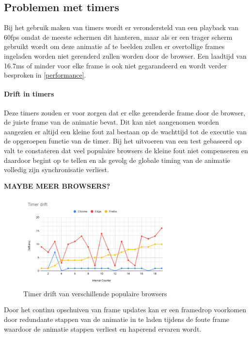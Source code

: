 \subsection{Problemen met timers}
Bij het gebruik maken van timers wordt er verondersteld van een playback van 60fps omdat de meeste schermen dit hanteren, maar als er een trager scherm gebruikt wordt om deze animatie af te beelden zullen er overtollige frames ingeladen worden niet gerenderd zullen worden door de browser. Een laadtijd van 16.7ms of minder voor elke frame is ook niet gegarandeerd en wordt verder besproken in \ref{performance}.

\paragraph{Drift in timers}Deze timers zouden er voor zorgen dat er elke gerenderde frame door de browser, de juiste frame van de animatie bevat. Dit kan niet aangenomen worden aangezien er altijd een kleine fout zal bestaan op de wachttijd tot de executie van de opgeroepen functie van de timer. Bij het uitvoeren van een test gebaseerd op \cite{testDrift} valt te constateren dat veel populaire browsers de kleine fout niet compenseren en daardoor begint op te tellen en als gevolg de globale timing van de animatie volledig zijn synchronisatie verliest.

\textbf{MAYBE MEER BROWSERS?}

\begin{figure} [H]
	\centering
	\includegraphics [width=0.7\textwidth] {img/Timer drift.png}
	\caption{Timer drift van verschillende populaire browsers} \label{drift}
\end{figure}

Door het continu opschuiven van frame updates kan er een framedrop voorkomen door redundante stappen van de animatie in te laden tijdens de foute frame waardoor de animatie stappen verliest en haperend ervaren wordt.

